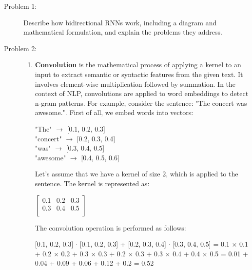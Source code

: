 \documentclass[10pt]{article}
\begin{document}
\begin{description}
\item[Problem 1:] \hfill Describe how bidirectional RNNs work, including a diagram and mathematical formulation, and explain the problems they address.

\pagebreak

\item[Problem 2:] \hfill %
 
    \begin{enumerate}
        \item \textbf{Convolution} is the mathematical process of applying a kernel to an input to extract semantic or syntactic features from the given text.
        It involves element-wise multiplication followed by summation. In the context of NLP, convolutions are applied to word embeddings to detect n-gram patterns.
        For example, consider the sentence: "The concert was awesome.". First of all, we embed words into vectors:

        \begin{center}
            "The" $\rightarrow$ [0.1, 0.2, 0.3] \\
            "concert" $\rightarrow$ [0.2, 0.3, 0.4] \\
            "was" $\rightarrow$ [0.3, 0.4, 0.5] \\
            "awesome" $\rightarrow$ [0.4, 0.5, 0.6]
        \end{center}

        Let's assume that we have a kernel of size 2, which is applied to the sentence. The kernel is represented as:

        \begin{center}
            $\displaystyle{\begin{bmatrix} 0.1 & 0.2 & 0.3 \\  0.3 & 0.4 & 0.5 \\ \end{bmatrix}}$
        \end{center}

        The convolution operation is performed as follows:

        \begin{center}
            [0.1, 0.2, 0.3] $\cdot$ [0.1, 0.2, 0.3] + [0.2, 0.3, 0.4] $\cdot$ [0.3, 0.4, 0.5] = 0.1 $\times$ 0.1 + 0.2 $\times$ 0.2 + 0.3 $\times$ 0.3 + 0.2 $\times$ 0.3 + 0.3 $\times$ 0.4 + 0.4 $\times$ 0.5 = 0.01 + 0.04 + 0.09 + 0.06 + 0.12 + 0.2 = 0.52
        \end{center}


\end{enumerate}
\end{description}
\end{document}
